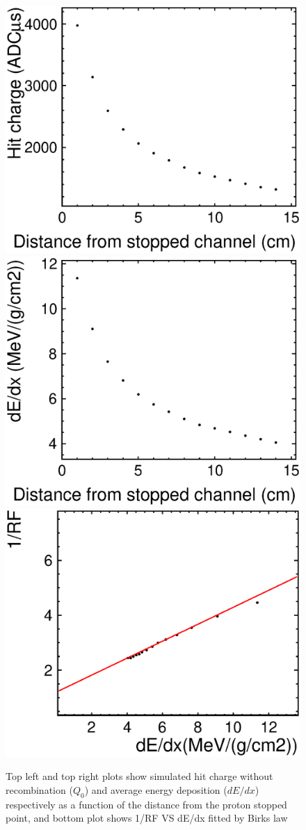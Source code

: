 %
\begin{figure}[!htb]
  \begin{center}
    \includegraphics[width=0.45\hsize,clip]{./fig/Q_02.eps}
    \includegraphics[width=0.45\hsize,clip]{./fig/dEdx2.eps}
    \includegraphics[width=0.8\hsize,clip]{./fig/RFresult2.eps}
    \caption{Top left and top right plots show simulated hit charge without recombination ($Q_0$) and
      average energy deposition ($dE/dx$) respectively as a function of the distance from the proton stopped point,
      and bottom plot shows 1/RF VS dE/dx fitted by Birks law}
    \label{Fig:Preco}
  \end{center}
\end{figure}
%

